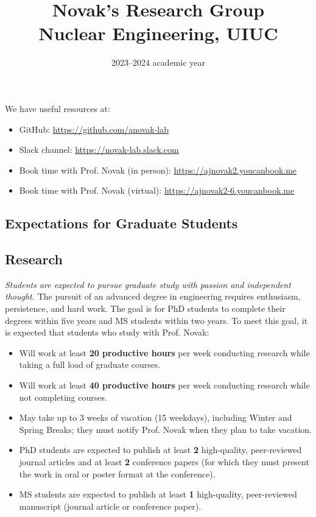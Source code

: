 \documentclass[12pt,twoside]{article}
\date{2023--2024 academic year}
\title{Novak's Research Group \\ Nuclear Engineering, UIUC}
\begin{document}
\maketitle

We have useful resources at:
\begin{itemize}
\item GitHub: \url{https://github.com/anovak-lab}
\item Slack channel: \url{https://novak-lab.slack.com}
\item Book time with Prof. Novak (in person): \url{https://ajnovak2.youcanbook.me}
\item Book time with Prof. Novak (virtual): \url{https://ajnovak2-6.youcanbook.me}
\end{itemize}

\begin{center}
\section*{Expectations for Graduate Students}
\end{center}

\subsection*{Research}

\textit{Students are expected to pursue graduate study with passion and independent thought.} The pursuit of an advanced degree in engineering requires enthusiasm, persistence, and hard work. The goal is for PhD students to complete their degrees within five years and MS students within two years. To meet this goal, it is expected that students who study with Prof. Novak:
%
\begin{itemize}
\item Will work at least \textbf{20 productive hours} per week conducting research while taking a full load of graduate courses.
\item Will work at least \textbf{40 productive hours} per week conducting research while not completing courses.
\item May take up to 3 weeks of vacation (15 weekdays), including Winter and Spring Breaks; they must notify Prof. Novak when they plan to take vacation.
\item PhD students are expected to publish at least \textbf{2} high-quality, peer-reviewed journal articles and at least \textbf{2} conference papers (for which they must present the work in oral or poster format at the conference).
\item MS students are expected to publish at least \textbf{1} high-quality, peer-reviewed manuscript (journal article or conference paper).
\end{itemize}
\end{document}
